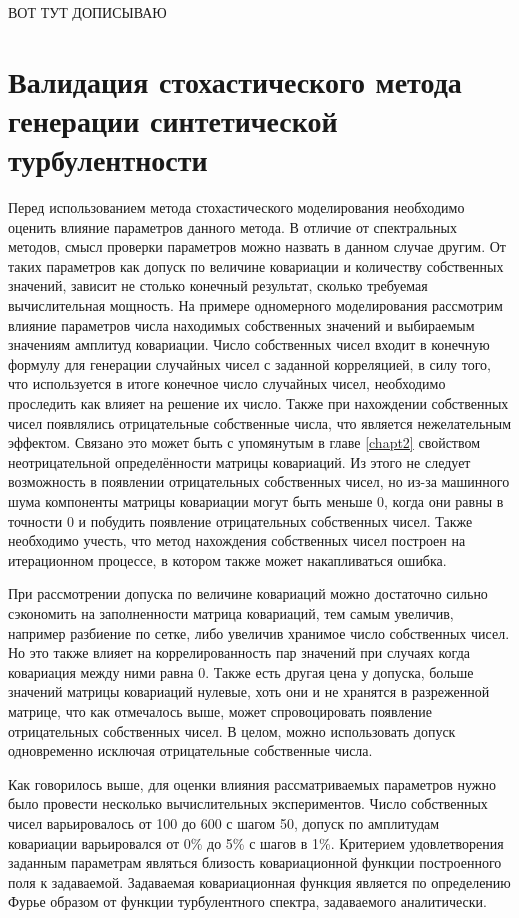 ВОТ ТУТ ДОПИСЫВАЮ

 
\chapter{Валидация стохастического метода генерации синтетической турбулентности} \label{chapt5}
Перед использованием метода стохастического моделирования необходимо оценить влияние параметров данного метода. В отличие от спектральных методов, смысл проверки параметров можно назвать в данном случае другим. От таких параметров как допуск по величине ковариации и количеству собственных значений, зависит не столько конечный результат, сколько требуемая вычислительная мощность. На примере одномерного моделирования рассмотрим влияние параметров числа находимых собственных значений и выбираемым значениям амплитуд ковариации. Число собственных чисел входит в конечную формулу для генерации случайных чисел с заданной корреляцией, в силу того, что используется в итоге конечное число случайных чисел, необходимо проследить как влияет на решение их число. Также при нахождении собственных чисел появлялись отрицательные собственные числа, что является нежелательным эффектом. Связано это может быть с упомянутым в главе \ref{chapt2} свойством неотрицательной определённости матрицы ковариаций. Из этого не следует возможность в появлении отрицательных собственных чисел, но из-за машинного шума компоненты матрицы ковариации могут быть меньше 0, когда они равны в точности 0 и побудить появление отрицательных собственных чисел. Также необходимо учесть, что метод нахождения собственных чисел построен на итерационном процессе, в котором также может накапливаться ошибка.

При рассмотрении допуска по величине ковариаций можно достаточно сильно сэкономить на заполненности матрица ковариаций, тем самым увеличив, например разбиение по сетке, либо увеличив хранимое число собственных чисел. Но это также влияет на коррелированность пар значений при случаях когда ковариация между ними равна 0. Также есть другая цена у допуска, больше значений матрицы ковариаций нулевые, хоть они и не хранятся в разреженной матрице, что как отмечалось выше, может спровоцировать появление отрицательных собственных чисел. В целом, можно использовать допуск одновременно исключая отрицательные собственные числа.

Как говорилось выше, для оценки влияния рассматриваемых параметров нужно было провести несколько вычислительных экспериментов. Число собственных чисел варьировалось от 100 до 600 с шагом 50, допуск по амплитудам ковариации варьировался от 0\% до 5\% с шагов в 1\%. Критерием удовлетворения заданным параметрам являться близость ковариационной функции построенного поля к задаваемой. Задаваемая ковариационная функция является по определению Фурье образом от функции турбулентного спектра, задаваемого аналитически.

